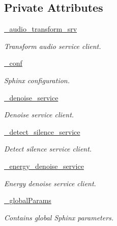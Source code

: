 \subsection*{Private Attributes}
\begin{DoxyCompactItemize}
\item 
\hyperlink{classrapp__speech__detection__sphinx4_1_1sphinx4__wrapper_1_1Sphinx4Wrapper_adb28d10db0b145ae5607eefbfa07edd3}{\-\_\-audio\-\_\-transform\-\_\-srv}
\begin{DoxyCompactList}\small\item\em Transform audio service client. \end{DoxyCompactList}\item 
\hyperlink{classrapp__speech__detection__sphinx4_1_1sphinx4__wrapper_1_1Sphinx4Wrapper_a8b61ba8ea3e28ea8cb2317d1a83a2730}{\-\_\-conf}
\begin{DoxyCompactList}\small\item\em Sphinx configuration. \end{DoxyCompactList}\item 
\hyperlink{classrapp__speech__detection__sphinx4_1_1sphinx4__wrapper_1_1Sphinx4Wrapper_ad2e35b438312ce2396718371a9461597}{\-\_\-denoise\-\_\-service}
\begin{DoxyCompactList}\small\item\em Denoise service client. \end{DoxyCompactList}\item 
\hyperlink{classrapp__speech__detection__sphinx4_1_1sphinx4__wrapper_1_1Sphinx4Wrapper_a59c868f2dda79206d0a53650d93f6f8b}{\-\_\-detect\-\_\-silence\-\_\-service}
\begin{DoxyCompactList}\small\item\em Detect silence service client. \end{DoxyCompactList}\item 
\hyperlink{classrapp__speech__detection__sphinx4_1_1sphinx4__wrapper_1_1Sphinx4Wrapper_a72b86a6db9d93651c9202cb5cbf67c4b}{\-\_\-energy\-\_\-denoise\-\_\-service}
\begin{DoxyCompactList}\small\item\em Energy denoise service client. \end{DoxyCompactList}\item 
\hyperlink{classrapp__speech__detection__sphinx4_1_1sphinx4__wrapper_1_1Sphinx4Wrapper_aa4c29cee22a852acb4b6567e5bf8fafe}{\-\_\-global\-Params}
\begin{DoxyCompactList}\small\item\em Contains global Sphinx parameters. \end{DoxyCompactList}\item 

\end{DoxyCompactItemize}
